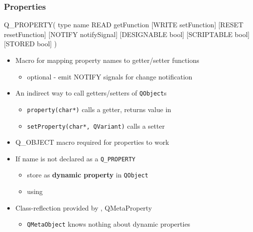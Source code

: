 \begin{frame}[fragile]
\frametitle{Properties}
\begin{cpp}
    Q_PROPERTY( type name READ getFunction [WRITE setFunction]
    [RESET resetFunction] [NOTIFY notifySignal] [DESIGNABLE bool]
    [SCRIPTABLE bool] [STORED bool] )
\end{cpp}
\begin{itemize}
\item Macro for mapping property names to getter/setter functions
    \begin{itemize}
    \item optional - emit NOTIFY signals for change notification 
    \end{itemize}
\item An indirect way to call getters/setters of \texttt{QObject}s
    \begin{itemize}
    \item \texttt{property(char*)} calls a getter, returns value in 
    \item \texttt{setProperty(char*, QVariant)} calls a setter
    \end{itemize}
\item Q\_OBJECT macro required for properties to work

\item If name is not declared as a \texttt{Q\_PROPERTY}
    \begin{itemize}
    \item store as \textbf{dynamic property} in \texttt{QObject}
    \item using   
    \end{itemize}
\item Class-reflection provided by , \iCls
{QMetaProperty}
    \begin{itemize}
    \item \texttt{QMetaObject} knows nothing about dynamic properties
    \end{itemize}
\end{itemize}
\end{frame}


